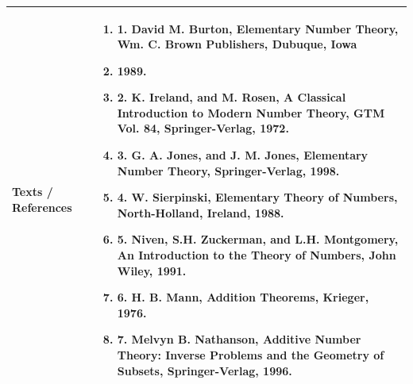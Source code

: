 \documentclass[11pt,a4paper]{article}
\begin{document}
\vspace{8pt}
\renewcommand{\arraystretch}{1.3}
\begin{tabularx}{\textwidth}{|p{3.2cm}|X|}
\hline
\textbf{Texts / References} & \begin{enumerate}[leftmargin=*,noitemsep,topsep=2pt]  \item 1. David M. Burton, Elementary Number Theory, Wm. C. Brown Publishers, Dubuque, Iowa  \item 1989.  \item 2. K. Ireland, and M. Rosen, A Classical Introduction to Modern Number Theory, GTM Vol. 84,  Springer-Verlag, 1972.  \item 3. G. A. Jones, and J. M. Jones, Elementary Number Theory, Springer-Verlag, 1998.  \item 4. W. Sierpinski, Elementary Theory of Numbers, North-Holland, Ireland, 1988.  \item 5. Niven, S.H. Zuckerman, and L.H. Montgomery, An Introduction to the Theory of Numbers,  John Wiley, 1991.  \item 6. H. B. Mann, Addition Theorems, Krieger, 1976.  \item 7. Melvyn B. Nathanson, Additive Number Theory: Inverse Problems and the Geometry of  Subsets, Springer-Verlag, 1996.\end{enumerate} \\
\hline
\end{tabularx}
\clearpage
\end{document}
